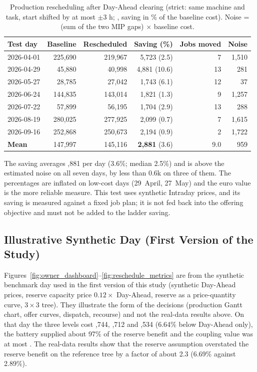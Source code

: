 \documentclass[journal]{IEEEtran}
\begin{document}
\begin{table}[t]
\caption{Production rescheduling after Day-Ahead clearing (strict: same machine and task, start shifted by at most $\pm3$ h; \texteuro, saving in \% of the baseline cost). Noise = (sum of the two MIP gaps) $\times$ baseline cost.}
\label{tab:rescheduling_results}
\centering
\scriptsize
\setlength{\tabcolsep}{2.5pt}
\begin{tabular}{@{}lrrrrr@{}}
\toprule
\textbf{Test day} & \textbf{Baseline} & \textbf{Rescheduled} & \textbf{Saving (\%)} & \textbf{Jobs moved} & \textbf{Noise} \\
\midrule
2026-04-01 & 225,690 & 219,967 & 5,723 (2.5) & 7 & 1,510 \\
2026-04-29 & 45,880 & 40,998 & 4,881 (10.6) & 13 & 281 \\
2026-05-27 & 28,785 & 27,042 & 1,743 (6.1) & 12 & 37 \\
2026-06-24 & 144,835 & 143,014 & 1,821 (1.3) & 9 & 1,257 \\
2026-07-22 & 57,899 & 56,195 & 1,704 (2.9) & 13 & 288 \\
2026-08-19 & 280,025 & 277,925 & 2,099 (0.7) & 7 & 1,615 \\
2026-09-16 & 252,868 & 250,673 & 2,194 (0.9) & 2 & 1,722 \\
\midrule
\textbf{Mean} & 147,997 & 145,116 & \textbf{2,881} (3.6) & 9.0 & 959 \\
\bottomrule
\end{tabular}
\end{table}

The saving averages ,881 per day (3.6\%; median 2.5\%) and is above the estimated noise on all seven days, by less than \texteuro 0.6k on three of them. The percentages are inflated on low-cost days (29~April, 27~May) and the euro value is the more reliable measure. This test uses synthetic Intraday prices, and its saving is measured against a fixed job plan; it is not fed back into the offering objective and must not be added to the ladder saving.

\subsection{Illustrative Synthetic Day (First Version of the Study)}
Figures~\ref{fig:owner_dashboard}--\ref{fig:reschedule_metrics} are from the synthetic benchmark day used in the first version of this study (synthetic Day-Ahead prices, reserve capacity price $0.12\times$ Day-Ahead, reserve as a price-quantity curve, $3\times3$ tree). They illustrate the form of the decisions (production Gantt chart, offer curves, dispatch, recourse) and not the real-data results above. On that day the three levels cost ,744, ,712 and ,534 (6.64\% below Day-Ahead only), the battery supplied about 97\% of the reserve benefit and the coupling value was at most . The real-data results show that the reserve assumption overstated the reserve benefit on the reference tree by a factor of about 2.3 (6.69\% against 2.89\%).
\end{document}
